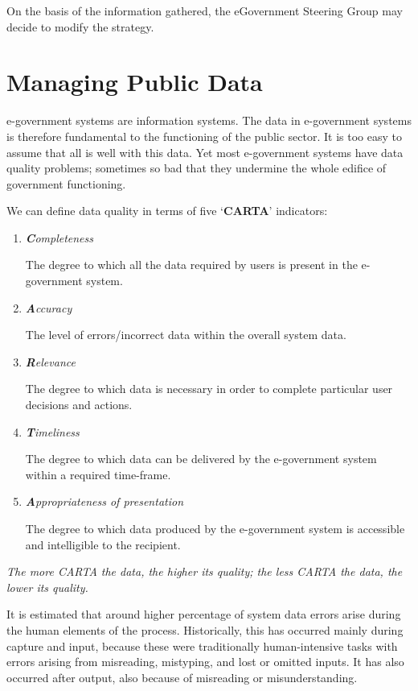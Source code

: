 On the basis of the information gathered, the eGovernment Steering Group may decide to modify the strategy.




\section{Managing Public Data}
e-government systems are information systems. The data in e-government systems is therefore fundamental to the functioning of the public sector. It is too easy to assume that all is well with this data. Yet most e-government systems have data quality problems; sometimes so bad that they undermine the whole edifice of government functioning.

We can define data quality in terms of five `\textbf{CARTA}' indicators:

\begin{enumerate}
	\item \textit{\textbf{C}ompleteness}
	
	The degree to which all the data required by users is present in the e-government system.
	
	\item \textit{\textbf{A}ccuracy}
	
	The level of errors/incorrect data within the overall system data.
	
	\item \textit{\textbf{R}elevance}
	
	The degree to which data is necessary in order to complete particular	user decisions and actions.
	
	\item \textit{\textbf{T}imeliness} 
	
	The degree to which data can be delivered by the e-government system within a required time-frame.
	
	\item \textit{\textbf{A}ppropriateness of presentation} 
	
	The degree to which data produced by the	e-government system is accessible and intelligible to the recipient.
\end{enumerate}

\textit{The more CARTA the data, the higher its quality; the less CARTA the data, the lower its quality.}



It is estimated that around higher percentage of system data errors arise during the human elements of the process. Historically, this has occurred mainly during capture and input, because these were traditionally human-intensive tasks with errors arising from misreading, mistyping, and lost or omitted inputs. It has also
occurred after output, also because of misreading or misunderstanding.

